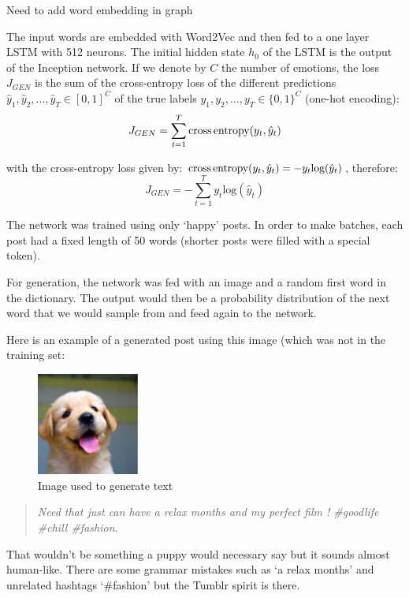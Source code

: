 Need to add word embedding in graph

The input words are embedded with Word2Vec and then fed to a one layer LSTM with 512 neurons. The initial hidden state $h_0$ of the LSTM is the output of the Inception network. If we denote by $C$ the number of emotions, the loss $J_{GEN}$ is the sum of the cross-entropy loss of the different predictions $\hat{y}_1, \hat{y}_2, ..., \hat{y}_T \in [0,1]^C$ of the true labels $y_1, y_2, ..., y_T \in \{0, 1\}^C$ (one-hot encoding):
\begin{equation}
    J_{GEN} = \sum_{t=1}^T \text{cross\,entropy}(y_t, \hat{y}_t)
\end{equation}

with the cross-entropy loss given by: $\text{cross\,entropy}(y_t, \hat{y}_t) = -y_t\text{log}(\hat{y}_t)$, therefore:
\begin{equation}
    J_{GEN} = -\sum_{t=1}^T y_t\text{log}(\hat{y}_t)
\end{equation}

The network was trained using only `happy' posts. In order to make batches, each post had a fixed length of 50 words (shorter posts were filled with a special token).

For generation, the network was fed with an image and a random first word in the dictionary. The output would then be a probability distribution of the next word that we would sample from and feed again to the network.

Here is an example of a generated post using this image (which was not in the training set:
\begin{figure}[H]
    \centering
    \includegraphics[width=0.3\textwidth]{Images/puppy.jpg}
    \caption{Image used to generate text}
\end{figure}

\begin{quote}
    \textit{Need that just can have a relax months and my perfect film ! \#goodlife \#chill \#fashion}.
\end{quote}

That wouldn't be something a puppy would necessary say but it sounds almost human-like. There are some grammar mistakes such as `a relax months' and unrelated hashtags `\#fashion' but the Tumblr spirit is there.







